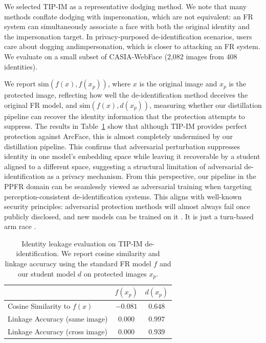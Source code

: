 We selected TIP-IM \cite{yang_towards_2021} as a representative dodging method. We note that many methods \cite{salar_enhancing_2025, hu_protecting_2022} conflate dodging with impersonation, which are not equivalent: an FR system can simultaneously associate a face with both the original identity and the impersonation target. In privacy-purposed de-identification scenarios, users care about dogging andimpersonation, which is closer to attacking an FR system. We evaluate on a small subset of CASIA-WebFace (2,082 images from 408 identities). 

We report $\text{sim}(f(x), f(x_p))$, where $x$ is the original image and $x_p$ is the protected image, reflecting how well the de-identification method deceives the original FR model, and $\text{sim}(f(x), d(x_p))$, measuring whether our distillation pipeline can recover the identity information that the protection attempts to suppress. The results in Table~\ref{tab:deid} show that although TIP-IM provides perfect protection against ArcFace, this is almost completely undermined by our distillation pipeline. This confirms that adversarial perturbation suppresses identity in one model's embedding space while leaving it recoverable by a student aligned to a different space, suggesting a structural limitation of adversarial de-identification as a privacy mechanism. From this perspective, our pipeline in the PPFR domain can be seamlessly viewed as adversarial training \cite{goodfellow_explaining_2015} when targeting perception-consistent de-identification systems. This aligns with well-known security principles: adversarial protection methods will almost always fail once publicly disclosed, and new models can be trained on it \cite{athalye_obfuscated_2018}. It is just a turn-based arm race \cite{biggio_wild_2017}.




\begin{table}[t]
\caption{Identity leakage evaluation on TIP-IM de-identification. We report cosine similarity and linkage accuracy using the standard FR model $f$ and our student model $d$ on protected images $x_p$.}
\label{tab:deid}
\centering
\begin{tabular}{lcc}
\toprule
& $f(x_p)$ & $d(x_p)$ \\
\midrule
Cosine Similarity to $f(x)$ & $-0.081$& $0.648$\\
Linkage Accuracy (same image) & $0.000$& $0.997$ \\
Linkage Accuracy (cross image) & $0.000$& $0.939$\\
\bottomrule
\end{tabular}
\end{table}


